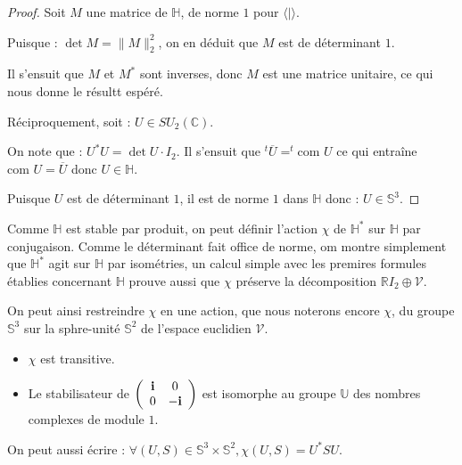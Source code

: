 \begin{proof}
Soit $M$ une matrice de $\mathbb{H}$, de norme $1$ pour $\langle | \rangle$.

\par
Puisque : $\det M=\|M\|_2^2$, on en d\'eduit que $M$ est de d\'eterminant $1$.

\par
Il s'ensuit que $M$ et $M^{\ast}$ sont inverses, donc $M$ est une matrice unitaire, ce qui nous donne le r\'esultt esp\'er\'e.

\par
R\'eciproquement, soit : $U\in SU_2(\mathbb{C})$.

\par
On note que : $U^{\ast}U=\det U\cdot I_2$. Il s'ensuit que $^t\overline{U}=^t\text{com }U$ ce qui entra\^ine $\text{com }U=\overline{U}$ donc $U\in\mathbb{H}$.

\par
Puisque $U$ est de d\'eterminant $1$, il est de norme $1$ dans $\mathbb{H}$ donc : $U\in\mathbb{S}^3$.
\end{proof}

Comme $\mathbb{H}$ est stable par produit, on peut d\'efinir l'action $\chi$ de $\mathbb{H}^{\ast}$ sur $\mathbb{H}$ par conjugaison. %
Comme le d\'eterminant fait office de norme, om montre simplement que $\mathbb{H}^{\ast}$ agit sur $\mathbb{H}$ par isom\'etries, %
un calcul simple avec les premires formules \'etablies concernant $\mathbb{H}$ prouve aussi que $\chi$ pr\'eserve la d\'ecomposition $\mathbb{R}I_2\oplus\mathcal{V}$.

\par
On peut ainsi restreindre $\chi$ en une action, que nous noterons encore $\chi$, du groupe $\mathbb{S}^3$ sur la sphre-unit\'e $\mathbb{S}^2$ de l'espace euclidien $\mathcal{V}$.

\begin{prop}
\begin{itemize}
\item $\chi$ est transitive.
\item Le stabilisateur de $\left(\begin{array}{cc}\mathbf{i}&0\\0&-\mathbf{i}\end{array}\right)$ est isomorphe au groupe $\mathbb{U}$ des nombres complexes de module $1$.
\end{itemize}
\end{prop}

\begin{rema}
On peut aussi \'ecrire : $\forall (U,S)\in\mathbb{S}^3\times\mathbb{S}^2 , \chi(U,S)=U^{\ast}SU$.
\end{rema}

